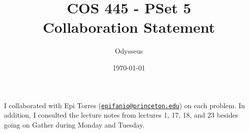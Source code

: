 \documentclass[12pt]{article}%
\begin{document}
\title{COS 445 - PSet 5 \\ Collaboration Statement} %
\author{Odysseus} %
\date{\today}
\maketitle

I collaborated with Epi Torres (\href{mailto:epifanio@princeton.edu}{\nolinkurl{epifanio@princeton.edu}}) on each problem. In addition, I consulted the lecture notes from lectures 1, 17, 18, and 23  besides going on Gather during Monday and Tuesday.
\end{document}
